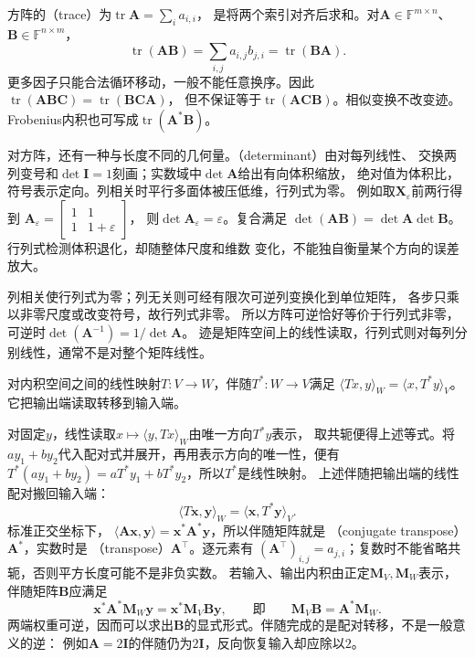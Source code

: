 方阵的（trace）为$\operatorname{tr}\bm A=\sum_i a_{i,i}$，
是将两个索引对齐后求和。对$\bm A\in\mathbb F^{m\times n}$、
$\bm B\in\mathbb F^{n\times m}$，
\begin{equation}
 \operatorname{tr}(\bm A\bm B)=\sum_{i,j}a_{i,j}b_{j,i}
 =\operatorname{tr}(\bm B\bm A).
 \label{eq:linear-algebra-trace-cyclic}
\end{equation}
更多因子只能合法循环移动，一般不能任意换序。因此
$\operatorname{tr}(\bm A\bm B\bm C)=\operatorname{tr}(\bm B\bm C\bm A)$，
但不保证等于$\operatorname{tr}(\bm A\bm C\bm B)$。相似变换不改变迹。
Frobenius内积也可写成$\operatorname{tr}(\bm A^*\bm B)$。


对方阵，还有一种与长度不同的几何量。（determinant）由对每列线性、
交换两列变号和$\det\bm I=1$刻画；实数域中$\det\bm A$给出有向体积缩放，
绝对值为体积比，符号表示定向。列相关时平行多面体被压低维，行列式为零。
例如取$\bm X_\varepsilon$前两行得到
$\bm A_\varepsilon=\left[\begin{smallmatrix}1&1\\1&1+\varepsilon\end{smallmatrix}\right]$，
则$\det\bm A_\varepsilon=\varepsilon$。复合满足
$\det(\bm A\bm B)=\det\bm A\det\bm B$。行列式检测体积退化，却随整体尺度和维数
变化，不能独自衡量某个方向的误差放大。


列相关使行列式为零；列无关则可经有限次可逆列变换化到单位矩阵，
各步只乘以非零尺度或改变符号，故行列式非零。
所以方阵可逆恰好等价于行列式非零，可逆时$\det(\bm A^{-1})=1/\det\bm A$。
迹是矩阵空间上的线性读取，行列式则对每列分别线性，通常不是对整个矩阵线性。
\begin{definition}[有限维伴随]
\label{def:linear-algebra-adjoint}
对内积空间之间的线性映射$T:V\to W$，伴随$T^*:W\to V$满足
$\langle Tx,y\rangle_W=\langle x,T^*y\rangle_V$。
它把输出端读取转移到输入端。
\end{definition}
对固定$y$，线性读取$x\mapsto\langle y,Tx\rangle_W$由唯一方向$T^*y$表示，
取共轭便得上述等式。将$ay_1+by_2$代入配对式并展开，再用表示方向的唯一性，便有
$T^*(ay_1+by_2)=aT^*y_1+bT^*y_2$，所以$T^*$是线性映射。
上述伴随把输出端的线性配对搬回输入端：
\[
 \langle T\bm x,\bm y\rangle_W=\langle\bm x,T^*\bm y\rangle_V.
\]
标准正交坐标下，
$\langle\bm A\bm x,\bm y\rangle=\bm x^*\bm A^*\bm y$，所以伴随矩阵就是
（conjugate transpose）$\bm A^*$，实数时是
（transpose）$\bm A^\top$。逐元素有
$(\bm A^\top)_{i,j}=a_{j,i}$；复数时不能省略共轭，否则平方长度可能不是非负实数。
若输入、输出内积由正定$\bm M_V,\bm M_W$表示，伴随矩阵$\bm B$应满足
\[
 \bm x^*\bm A^*\bm M_W\bm y=\bm x^*\bm M_V\bm B\bm y,
 \qquad\text{即}\qquad \bm M_V\bm B=\bm A^*\bm M_W.
\]
两端权重可逆，因而可以求出$\bm B$的显式形式。伴随完成的是配对转移，不是一般意义的逆：
例如$\bm A=2\bm I$的伴随仍为$2\bm I$，反向恢复输入却应除以$2$。


